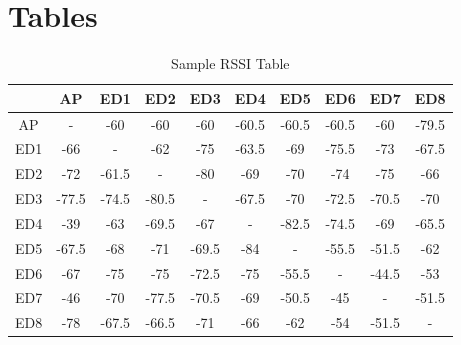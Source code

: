 \documentclass{article}
\begin{document}
\section{Tables}\label{appendix:tables}
\begin{table}[htb]
\label{tab:rssi}
\begin{tabular}{|c|c|c|c|c|c|c|c|c|c|}
\hline  & AP & ED1 & ED2 & ED3 & ED4 & ED5 & ED6 & ED7 & ED8 \\ 
\hline AP & - & -60 & -60 & -60 & -60.5 & -60.5 & -60.5 & -60 & -79.5 \\ 
\hline ED1 & -66 & - & -62 & -75 & -63.5 & -69 & -75.5 & -73 & -67.5 \\ 
\hline ED2 & -72 & -61.5 & - & -80 & -69 & -70 & -74 & -75 & -66 \\ 
\hline ED3 & -77.5 & -74.5 & -80.5 & - & -67.5 & -70 & -72.5 & -70.5 & -70 \\ 
\hline ED4 & -39 & -63 & -69.5 & -67 & - & -82.5 & -74.5 & -69 & -65.5 \\ 
\hline ED5 & -67.5 & -68 & -71 & -69.5 & -84 & - & -55.5 & -51.5 & -62 \\ 
\hline ED6 & -67 & -75 & -75 & -72.5 & -75 & -55.5 & - & -44.5 & -53 \\ 
\hline ED7 & -46 & -70 & -77.5 & -70.5 & -69 & -50.5 & -45 & - & -51.5 \\ 
\hline ED8 & -78 & -67.5 & -66.5 & -71 & -66 & -62 & -54 & -51.5 & - \\ 
\hline 
\end{tabular} 
\caption{Sample RSSI Table}
\end{table}
\end{document}
